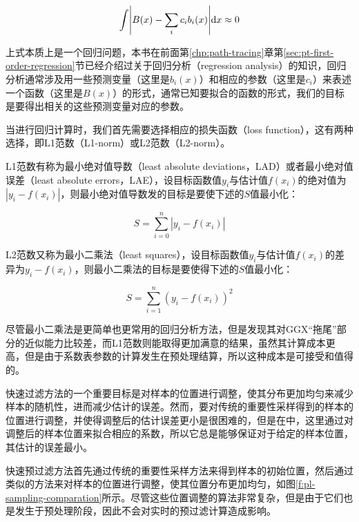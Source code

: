 \begin{equation}\label{e:pl-min-error-1}
	\int \Biggl| B(x)- \sum_i c_i b_i(x)\Biggl| {\rm d}x \approx 0
\end{equation}

上式本质上是一个回归问题，本书在前面第\ref{chp:path-tracing}章第\ref{sec:pt-first-order-regression}节已经介绍过关于回归分析（regression analysis）的知识，回归分析通常涉及用一些预测变量（这里是$b_i(x)$）和相应的参数（这里是$c_i$）来表述一个函数（这里是$B(x)$）的形式，通常已知要拟合的函数的形式，我们的目标是要得出相关的这些预测变量对应的参数。

当进行回归计算时，我们首先需要选择相应的损失函数（loss function），这有两种选择，即L1范数（L1-norm）或L2范数（L2-norm）。

L1范数有称为最小绝对值导数（least absolute deviations，LAD）或者最小绝对值误差（least absolute errors，LAE），设目标函数值$y_i$与估计值$f(x_i)$的绝对值为$|y_i-f(x_i)|$，则最小绝对值导数发的目标是要使下述的$S$值最小化：

\begin{equation}
	S=\sum^{n}_{i=0}|y_i-f(x_i)|
\end{equation}

L2范数又称为最小二乘法（least squares），设目标函数值$y_i$与估计值$f(x_i)$的差异为$y_i-f(x_i)$，则最小二乘法的目标是要使得下述的$S$值最小化：

\begin{equation}
	S=\sum^{n}_{i=1}(y_i-f(x_i))^{2}
\end{equation}

尽管最小二乘法是更简单也更常用的回归分析方法，但是\cite{a:FastFilteringofReflectionProbes}发现其对GGX“拖尾”部分的近似能力比较差，而L1范数则能取得更加满意的结果，虽然其计算成本更高，但是由于系数表参数的计算发生在预处理结算，所以这种成本是可接受和值得的。

快速过滤方法的一个重要目标是对样本的位置进行调整，使其分布更加均匀来减少样本的随机性，进而减少估计的误差。然而，要对传统的重要性采样得到的样本的位置进行调整，并使得调整后的估计误差更小是很困难的，但是在\cite{a:FastFilteringofReflectionProbes}中，这里通过对调整后的样本位置来拟合相应的系数，所以它总是能够保证对于给定的样本位置，其估计的误差最小。

快速预过滤方法首先通过传统的重要性采样\cite{a:Real-timeShadingwithFilteredImportanceSampling}方法来得到样本的初始位置，然后通过类似\cite{a:OnthelimitedmemoryBFGSmethodforlargescaleoptimization}的方法来对样本的位置进行调整，使其位置分布更加均匀，如图\ref{f:pl-sampling-comparation}所示。尽管这些位置调整的算法非常复杂，但是由于它们也是发生于预处理阶段，因此不会对实时的预过滤计算造成影响。

